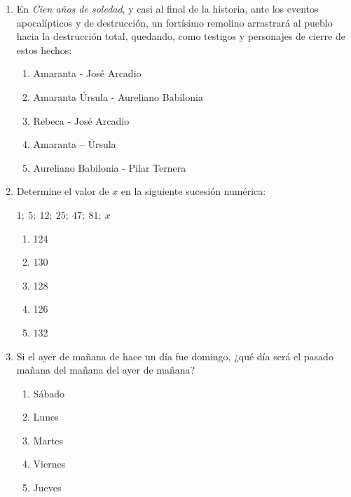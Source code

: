 \begin{enumerate}
	1. una embajada en París\\
	2. asistir, citado él también, al día siguiente a la reunión de diputados\\
	3. una embajada en Roma\\
	4. Don Fernando citará a todos sus ministros para el tema acordado\\
	5. la embajada de Italia y arreglar los caminos a su tierra

	Son ciertas:
	\begin{enumerate}[label=\alph*)]
		\item 1 y 2
		\item 1 y 3
		\item 2 y 3
		\item 3 y 4
		\item 4 y 5
	\end{enumerate}

	\item En \textit{Cien años de soledad}, y casi al final de la historia, ante los eventos apocalípticos y de destrucción, un fortísimo remolino arrastrará al pueblo hacia la destrucción total, quedando, como testigos y personajes de cierre de estos hechos:
	\begin{enumerate}[label=\alph*)]
		\item Amaranta - José Arcadio
		\item Amaranta Úrsula - Aureliano Babilonia
		\item Rebeca - José Arcadio
		\item Amaranta -- Úrsula
		\item Aureliano Babilonia - Pilar Ternera
	\end{enumerate}

	\item Determine el valor de $x$ en la siguiente sucesión numérica:

	$1;\ 5;\ 12;\ 25;\ 47;\ 81;\ x$

	\begin{enumerate}[label=\alph*)]
		\item 124
		\item 130
		\item 128
		\item 126
		\item 132
	\end{enumerate}

	\item Si el ayer de mañana de hace un día fue domingo, ¿qué día será el pasado mañana del mañana del ayer de mañana?
	\begin{enumerate}[label=\alph*)]
		\item Sábado
		\item Lunes
		\item Martes
		\item Viernes
		\item Jueves
	\end{enumerate}


\end{enumerate}
